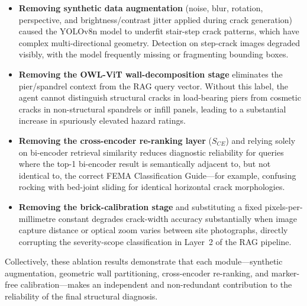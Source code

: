 \begin{itemize}[noitemsep, leftmargin=1.5em]
  \item \textbf{Removing synthetic data augmentation} (noise, blur, rotation,
        perspective, and brightness/contrast jitter applied during crack
        generation) caused the YOLOv8n model to underfit stair-step crack
        patterns, which have complex multi-directional geometry.
        Detection on step-crack images degraded visibly, with the model
        frequently missing or fragmenting bounding boxes.

  \item \textbf{Removing the OWL-ViT wall-decomposition stage} eliminates the
        pier/spandrel context from the RAG query vector.
        Without this label, the agent cannot distinguish structural cracks in
        load-bearing piers from cosmetic cracks in non-structural spandrels or
        infill panels, leading to a substantial increase in spuriously elevated
        hazard ratings.

  \item \textbf{Removing the cross-encoder re-ranking layer} ($S_{CE}$) and
        relying solely on bi-encoder retrieval similarity reduces diagnostic
        reliability for queries where the top-1 bi-encoder result is
        semantically adjacent to, but not identical to, the correct FEMA
        Classification Guide---for example, confusing rocking with bed-joint
        sliding for identical horizontal crack morphologies.

  \item \textbf{Removing the brick-calibration stage} and substituting a fixed
        pixels-per-millimetre constant degrades crack-width accuracy substantially
        when image capture distance or optical zoom varies between site
        photographs, directly corrupting the severity-scope classification in
        Layer~2 of the RAG pipeline.
\end{itemize}

\begin{sloppypar}
Collectively, these ablation results demonstrate that each module---synthetic
augmentation, geometric wall partitioning, cross-encoder re-ranking, and
marker-free calibration---makes an independent and non-redundant contribution to
the reliability of the final structural diagnosis.
\end{sloppypar}
